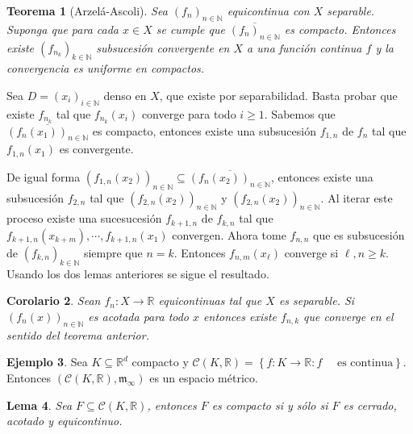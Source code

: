 \documentclass[12pt]{article}
\theoremstyle{plain}
\newtheorem{Th}{Teorema}[subsection]   %
\newtheorem{Lem}[Th]{Lema}             %
\newtheorem{Cor}[Th]{Corolario}        %
\theoremstyle{definition}
\newtheorem{Ex}[Th]{Ejemplo}               %
\theoremstyle{remark}
\numberwithin{equation}{section}
\newcommand{\bN}{\mathbb{N}}        %
\newcommand{\bR}{\mathbb{R}}        %
\newcommand{\cC}{\mathcal{C}}       %
\newcommand{\mm}{\mathfrak{m}}      %
\renewcommand{\geq}{\geqslant}      %
\renewcommand{\:}{\colon}           %
\newcommand{\conj}[1]{\left\lbrace#1\right\rbrace}
\begin{document}
\begin{multicols}{2}
\begin{Th}[Arzelá-Ascoli]\label{lem:ArzelaAscoli}
  Sea $(f_n)_{n\in\bN}$ equicontinua con $X$ separable. Suponga que para cada $x\in X$ se cumple que $\overline{(f_n)_{n\in\bN}}$ es compacto. Entonces existe $(f_{n_k})_{k\in\bN}$ subsucesión convergente en $X$ a una función continua $f$ y la convergencia es uniforme en compactos.
\end{Th}

\begin{ptcbp}
Sea $D=(x_i)_{i\in\bN}$ denso en $X$, que existe por separabilidad. Basta probar que existe $f_{n_k}$ tal que $f_{n_k}(x_i)$ converge para todo $i\geq 1$. Sabemos que $\overline{(f_n(x_1))_{n\in\bN}}$ es compacto, entonces existe una subsucesión $f_{1,n}$ de $f_n$ tal que $f_{1,n}(x_1)$ es convergente.\par
De igual forma $(f_{1,n}(x_2))_{n\in\bN}\subseteq\overline{(f_n(x_2))_{n\in\bN}}$, entonces existe una subsucesión $f_{2,n}$ tal que $(f_{2,n}(x_2))_{n\in\bN}$ y $(f_{2,n}(x_2))_{n\in\bN}$. Al iterar este proceso existe una sucesucesión $f_{k+1,n}$ de $f_{k,n}$ tal que $f_{k+1,n}(x_{k+m}),\cdots,f_{k+1,n}(x_1)$ convergen. Ahora tome $f_{n,n}$ que es subsucesión de $(f_{k,n})_{k\in\bN}$ siempre que $n=k$. Entonces $f_{n,m}(x_\ell)$ converge si $\ell,n\geq k$. Usando los dos lemas anteriores se sigue el resultado.
\end{ptcbp}

\begin{Cor}
  Sean $f_n\colon X\to \bR$ equicontinuas tal que $X$ es separable. Si $(f_n(x))_{n\in\bN}$ es acotada para todo $x$ entonces existe $f_{n,k}$
 que converge en el sentido del teorema anterior.
 \end{Cor}


 \begin{Ex}
   Sea $K\subseteq\bR^d$ compacto y $\cC(K,\bR)=\conj{f\colon K\to\bR\colon f \quad\text{ es continua}}$. Entonces $(\cC(K,\bR),\mm_{\infty})$ es un espacio métrico.
 \end{Ex}

 \begin{Lem}
   Sea $F\subseteq\cC(K,\bR)$, entonces $F$ es compacto si y sólo si $F$ es cerrado, acotado y equicontinuo.
 \end{Lem}


\end{multicols}
\end{document}

